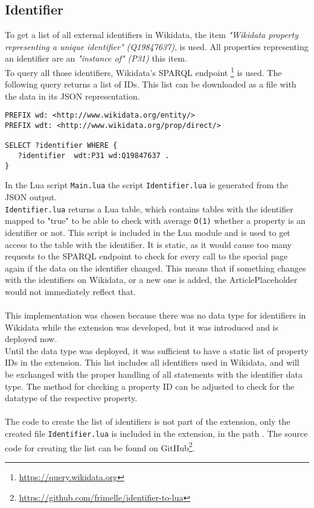 \subsection{Identifier}

To get a list of all external identifiers in Wikidata, the item \textit{"Wikidata property representing a unique identifier" (Q19847637)}, is used. All properties representing an identifier are an \textit{"instance of" (P31)} this item. \\
To query all those identifiers, Wikidata's SPARQL endpoint \footnote{\href{https://query.wikidata.org}{https://query.wikidata.org}} is used. The following query returns a list of IDs. This list can be downloaded as a file with the data in its JSON representation. \\

\begin{lstlisting}[frame=single] 
PREFIX wd: <http://www.wikidata.org/entity/>
PREFIX wdt: <http://www.wikidata.org/prop/direct/>

SELECT ?identifier WHERE {
   ?identifier  wdt:P31 wd:Q19847637 . 
}
\end{lstlisting}
In the Lua script \texttt{\justify Main.lua} the script \texttt{\justify Identifier.lua} is generated from the JSON output. \\  \texttt{\justify Identifier.lua} returns a Lua table, which contains tables with the identifier mapped to "true" to be able to check with average \texttt{\justify O(1)} whether a property is an identifier or not. This script is included in the Lua module and is used to get access to the table with the identifier. It is static, as it would cause too many requests to the SPARQL endpoint to check for every call to the special page again if the data on the identifier changed. This means that if something changes with the identifiers on Wikidata, or a new one is added, the ArticlePlaceholder would not immediately reflect that. \\
\\
This implementation was chosen because there was no data type for identifiers in Wikidata while the extension was developed, but it was introduced and is deployed now. \\
Until the data type was deployed, it was sufficient to have a static list of property IDs in the extension. This list includes all identifiers used in Wikidata, and will be exchanged with the proper handling of all statements with the identifier data type. The method for checking a property ID can be adjusted to check for the datatype of the respective property. \\
\\
The code to create the list of identifiers is not part of the extension, only the created file \texttt{\justify Identifier.lua} is included in the extension, in the path . The source code for creating the list can be found on GitHub\footnote{\href{https://github.com/frimelle/identifier-to-lua}{https://github.com/frimelle/identifier-to-lua}}. 
